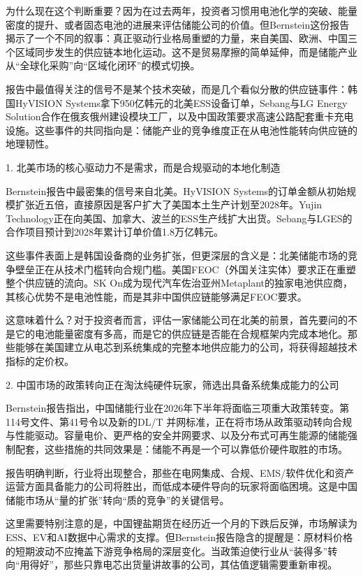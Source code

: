 \documentclass[11pt]{ctexart}
\begin{document}
为什么现在这个判断重要？因为在过去两年，投资者习惯用电池化学的突破、能量密度的提升、或者固态电池的进展来评估储能公司的价值。但Bernstein这份报告揭示了一个不同的叙事：真正驱动行业格局重塑的力量，来自美国、欧洲、中国三个区域同步发生的供应链本地化运动。这不是贸易摩擦的简单延伸，而是储能产业从“全球化采购”向“区域化闭环”的模式切换。

报告中最值得关注的信号不是某个技术突破，而是几个看似分散的供应链事件：韩国HyVISION Systems拿下950亿韩元的北美ESS设备订单，Sebang与LG Energy Solution合作在俄亥俄州建设模块工厂，以及中国政策要求高速公路配套重卡充电设施。这些事件的共同指向是：储能产业的竞争维度正在从电池性能转向供应链的地理韧性。

1. 北美市场的核心驱动力不是需求，而是合规驱动的本地化制造

Bernstein报告中最密集的信号来自北美。HyVISION Systems的订单金额从初始规模扩张近五倍，直接原因是客户扩大了美国本土生产计划至2028年。Yujin Technology正在向美国、加拿大、波兰的ESS生产线扩大出货。Sebang与LGES的合作项目预计到2028年累计订单价值1.8万亿韩元。

这些事件表面上是韩国设备商的业务扩张，但更深层的含义是：北美储能市场的竞争壁垒正在从技术门槛转向合规门槛。美国FEOC（外国关注实体）要求正在重塑整个供应链的流向。SK On成为现代汽车佐治亚州Metaplant的独家电池供应商，其核心优势不是电池性能，而是其非中国供应链能够满足FEOC要求。

这意味着什么？对于投资者而言，评估一家储能公司在北美的前景，首先要问的不是它的电池能量密度有多高，而是它的供应链是否能在合规框架内完成本地化。那些能够在美国建立从电芯到系统集成的完整本地供应能力的公司，将获得超越技术指标的定价权。

2. 中国市场的政策转向正在淘汰纯硬件玩家，筛选出具备系统集成能力的公司

Bernstein报告指出，中国储能行业在2026年下半年将面临三项重大政策转变。第114号文件、第41号令以及新的DL/T 并网标准，正在将市场从政策驱动转向合规与性能驱动。容量电价、更严格的安全并网要求、以及分布式可再生能源的储能强制配套，这些措施的共同效果是：储能不再是一个可以靠低价硬件取胜的市场。

报告明确判断，行业将出现整合，那些在电网集成、合规、EMS/软件优化和资产运营方面具备能力的公司将胜出，而低成本硬件导向的玩家将面临困境。这是中国储能市场从“量的扩张”转向“质的竞争”的关键信号。

这里需要特别注意的是，中国锂盐期货在经历近一个月的下跌后反弹，市场解读为ESS、EV和AI数据中心需求的支撑。但Bernstein报告隐含的提醒是：原材料价格的短期波动不应掩盖下游竞争格局的深层变化。当政策迫使行业从“装得多”转向“用得好”，那些只靠电芯出货量讲故事的公司，其估值逻辑需要重新审视。
\end{document}
